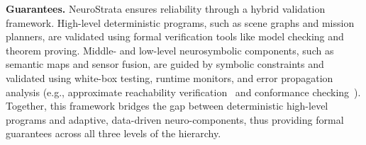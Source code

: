 \textbf{Guarantees.} 
NeuroStrata ensures reliability through a hybrid validation framework. High-level deterministic programs, such as scene graphs and mission planners, are validated using formal verification tools like model checking and theorem proving. Middle- and low-level neurosymbolic components, such as semantic maps and sensor fusion, are guided by symbolic constraints and validated using white-box testing, runtime monitors, and error propagation analysis (e.g., approximate reachability verification~\cite{geng_bridging_2024} and conformance checking~\cite{habeeb_approximate_2024}). Together, this framework bridges the gap between deterministic high-level programs and adaptive, data-driven neuro-components, thus providing formal guarantees across all three levels of the hierarchy.






